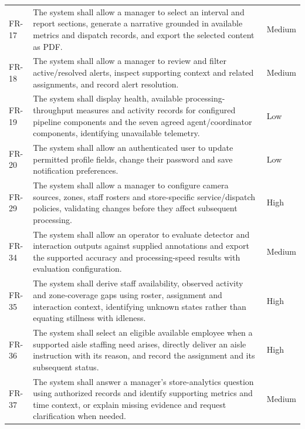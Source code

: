 \begin{longtable}{P{0.10\textwidth}P{0.68\textwidth}P{0.12\textwidth}}
FR-17 & The system shall allow a manager to select an interval and report sections, generate a narrative grounded in available metrics and dispatch records, and export the selected content as PDF. & Medium\\
FR-18 & The system shall allow a manager to review and filter active/resolved alerts, inspect supporting context and related assignments, and record alert resolution. & Medium\\
FR-19 & The system shall display health, available processing-throughput measures and activity records for configured pipeline components and the seven agreed agent/coordinator components, identifying unavailable telemetry. & Low\\
FR-20 & The system shall allow an authenticated user to update permitted profile fields, change their password and save notification preferences. & Low\\
FR-29 & The system shall allow a manager to configure camera sources, zones, staff rosters and store-specific service/dispatch policies, validating changes before they affect subsequent processing. & High\\
FR-34 & The system shall allow an operator to evaluate detector and interaction outputs against supplied annotations and export the supported accuracy and processing-speed results with evaluation configuration. & Medium\\
FR-35 & The system shall derive staff availability, observed activity and zone-coverage gaps using roster, assignment and interaction context, identifying unknown states rather than equating stillness with idleness. & High\\
FR-36 & The system shall select an eligible available employee when a supported aisle staffing need arises, directly deliver an aisle instruction with its reason, and record the assignment and its subsequent status. & High\\
FR-37 & The system shall answer a manager's store-analytics question using authorized records and identify supporting metrics and time context, or explain missing evidence and request clarification when needed. & Medium\\
\bottomrule
\end{longtable}
